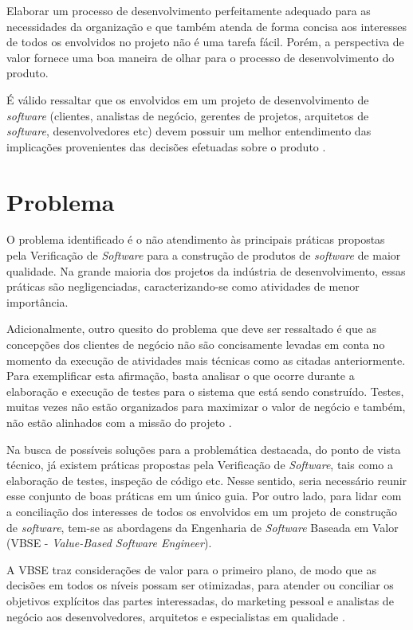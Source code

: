 Elaborar um processo de desenvolvimento perfeitamente adequado para as necessidades da organização e que também atenda de forma concisa aos interesses de todos os envolvidos no projeto não é uma tarefa fácil. Porém, a perspectiva de valor fornece uma boa maneira de olhar para o processo de desenvolvimento do produto.

É válido ressaltar que os envolvidos em um projeto de desenvolvimento de \textit{software} (clientes, analistas de negócio, gerentes de projetos, arquitetos de \textit{software}, desenvolvedores etc) devem possuir um melhor entendimento das implicações provenientes das decisões efetuadas sobre o produto \cite{vbse1}.

\section{Problema}

O problema identificado é o não atendimento às principais práticas propostas pela Verificação de \textit{Software} para a construção de produtos de \textit{software} de maior qualidade. Na grande maioria dos projetos da indústria de desenvolvimento, essas práticas são negligenciadas, caracterizando-se como atividades de menor importância.

Adicionalmente, outro quesito do problema que deve ser ressaltado é que as concepções dos clientes de negócio não são concisamente levadas em conta no momento da execução de atividades mais técnicas como as citadas anteriormente. Para exemplificar esta afirmação, basta analisar o que ocorre durante a elaboração e execução de testes para o sistema que está sendo construído. Testes, muitas vezes não estão organizados para maximizar o valor de negócio e também, não estão alinhados com a missão do projeto \cite{vbse2}.

Na busca de possíveis soluções para a problemática destacada, do ponto de vista técnico, já existem práticas propostas pela Verificação de \textit{Software}, tais como a elaboração de testes, inspeção de código etc. Nesse sentido, seria necessário reunir esse conjunto de boas práticas em um único guia. Por outro lado, para lidar com a conciliação dos interesses de todos os envolvidos em um projeto de construção de \textit{software}, tem-se as abordagens da Engenharia de \textit{Software} Baseada em Valor (VBSE - \textit{Value-Based Software Engineer}).

A VBSE traz considerações de valor para o primeiro plano, de modo que as decisões em todos os níveis possam ser otimizadas, para atender ou conciliar os objetivos explícitos das partes interessadas, do marketing pessoal e analistas de negócio aos desenvolvedores, arquitetos e especialistas em qualidade \cite{vbse1}.

